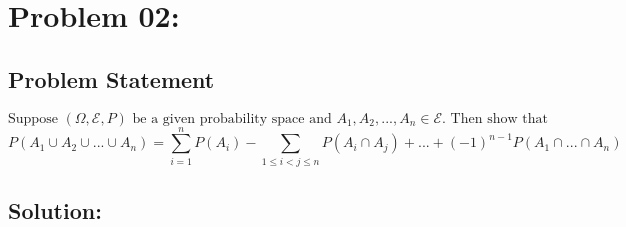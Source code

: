 \documentclass{article}
\theoremstyle{definition}
\begin{document}
\section{Problem 02:}
\begin{mdframed}[style = MyFrame]
\subsection{Problem Statement}
\[
\text{Suppose } (\Omega, \mathcal{E}, P) \text{ be a given probability space and } A_1, A_2, . . . , A_n \in \mathcal{E}. \text{ Then show that} \]
\[
P(A_1 \cup A_2 \cup . . . \cup A_n) = \sum_{i=1}^{n} P(A_i) -  \sum_{1\leq i < j\leq n} P(A_i \cap A_j) + ... + (-1)^{n-1}P(A_1\cap...\cap A_n)
\]
\end{mdframed}

\subsection{Solution:}
\end{document}
